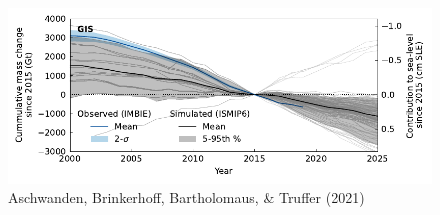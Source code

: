 \documentclass[hide notes,intlimits]{beamer}
\begin{document}
\begin{frame}[plain]
\end{frame}

  {
}

\begin{frame}
  \titlepage
\end{frame}

\begin{frame}
      \begin{figure}
        \includegraphics[width=\textwidth]{GIS_historical}
        \tiny{Aschwanden, Brinkerhoff, Bartholomaus, \& Truffer (2021)}
      \end{figure}
\end{frame}


  {
}

\begin{frame}
\end{frame}
\end{document}

